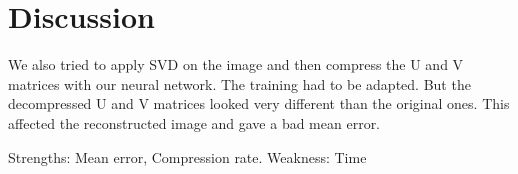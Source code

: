 \section{Discussion}

We also tried to apply SVD on the image and then compress the U and V matrices with our neural network. The training had to be adapted. But the decompressed U and V matrices looked very different than the original ones. This affected the reconstructed image and gave a bad mean error.\newline

Strengths: Mean error, Compression rate. \newline
Weakness: Time
